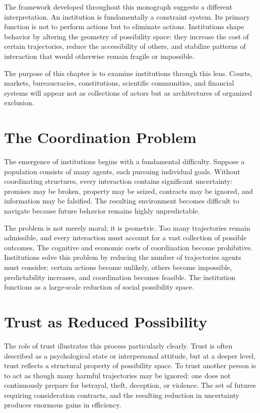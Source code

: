 \documentclass[11pt,oneside]{book}
\theoremstyle{plain}
\theoremstyle{definition}
\theoremstyle{remark}
\begin{document}
The framework developed throughout this monograph suggests a different interpretation. An institution is fundamentally a constraint system. Its primary function is not to perform actions but to eliminate actions. Institutions shape behavior by altering the geometry of possibility space: they increase the cost of certain trajectories, reduce the accessibility of others, and stabilize patterns of interaction that would otherwise remain fragile or impossible.

The purpose of this chapter is to examine institutions through this lens. Courts, markets, bureaucracies, constitutions, scientific communities, and financial systems will appear not as collections of actors but as architectures of organized exclusion.

\section{The Coordination Problem}

The emergence of institutions begins with a fundamental difficulty. Suppose a population consists of many agents, each pursuing individual goals. Without coordinating structures, every interaction contains significant uncertainty: promises may be broken, property may be seized, contracts may be ignored, and information may be falsified. The resulting environment becomes difficult to navigate because future behavior remains highly unpredictable.

The problem is not merely moral; it is geometric. Too many trajectories remain admissible, and every interaction must account for a vast collection of possible outcomes. The cognitive and economic costs of coordination become prohibitive. Institutions solve this problem by reducing the number of trajectories agents must consider: certain actions become unlikely, others become impossible, predictability increases, and coordination becomes feasible. The institution functions as a large-scale reduction of social possibility space.

\section{Trust as Reduced Possibility}

The role of trust illustrates this process particularly clearly. Trust is often described as a psychological state or interpersonal attitude, but at a deeper level, trust reflects a structural property of possibility space. To trust another person is to act as though many harmful trajectories may be ignored: one does not continuously prepare for betrayal, theft, deception, or violence. The set of futures requiring consideration contracts, and the resulting reduction in uncertainty produces enormous gains in efficiency.
\end{document}
